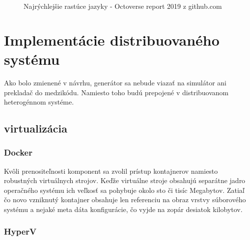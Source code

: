 \begin{figure} [H]
	\label{chart:githubgrow}
	\centering
{} 
\caption{Najrýchlejšie rastúce jazyky - Octoverse report 2019 z github.com \cite{githuboctoverse}}
\end{figure}

\section{Implementácie distribuovaného systému}
Ako bolo zmienené v návrhu, generátor sa nebude viazať na simulátor ani prekladač do medzikódu. Namiesto toho budú prepojené v distribuovanom heterogénnom systéme.

\subsection{virtualizácia}

\subsubsection{Docker}
Kvôli prenositeľnosti komponent sa zvolil prístup kontajnerov namiesto robustných virtuálnych strojov. Keďže virtuálne stroje obsahujú separátne jadro operačného systému ich veľkosť sa pohybuje okolo sto či tisíc Megabytov. Zatiaľ čo novo vzniknutý kontajner obsahuje len referenciu na obraz vrstvy súborového systému a nejaké meta dáta konfigurácie, čo vyjde na zopár desiatok kilobytov. \cite{kane2018docker}
\subsubsection{HyperV}

